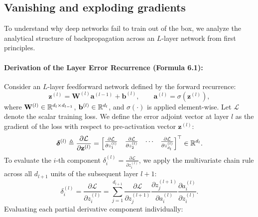 \subsection{Vanishing and exploding gradients}
\label{sec:vanishing_exploding_gradients}

To understand why deep networks fail to train out of the box, we analyze the analytical structure of backpropagation across an $L$-layer network from first principles.

\paragraph{Derivation of the Layer Error Recurrence (Formula 6.1):}
Consider an $L$-layer feedforward network defined by the forward recurrence:
\begin{equation}
\mathbf{z}^{(l)} = \mathbf{W}^{(l)} \mathbf{a}^{(l-1)} + \mathbf{b}^{(l)}, \qquad \mathbf{a}^{(l)} = \sigma(\mathbf{z}^{(l)}),
\end{equation}
where $\mathbf{W}^{(l)} \in \mathbb{R}^{d_l \times d_{l-1}}$, $\mathbf{b}^{(l)} \in \mathbb{R}^{d_l}$, and $\sigma(\cdot)$ is applied element-wise. Let $\mathcal{L}$ denote the scalar training loss. We define the error adjoint vector at layer $l$ as the gradient of the loss with respect to pre-activation vector $\mathbf{z}^{(l)}$:
\begin{equation}
\boldsymbol{\delta}^{(l)} \triangleq \frac{\partial \mathcal{L}}{\partial \mathbf{z}^{(l)}} = \begin{bmatrix} \frac{\partial \mathcal{L}}{\partial z_1^{(l)}} & \frac{\partial \mathcal{L}}{\partial z_2^{(l)}} & \cdots & \frac{\partial \mathcal{L}}{\partial z_{d_l}^{(l)}} \end{bmatrix}^\top \in \mathbb{R}^{d_l}.
\end{equation}
To evaluate the $i$-th component $\delta_i^{(l)} = \frac{\partial \mathcal{L}}{\partial z_i^{(l)}}$, we apply the multivariate chain rule across all $d_{l+1}$ units of the subsequent layer $l+1$:
\begin{equation}
\delta_i^{(l)} = \frac{\partial \mathcal{L}}{\partial z_i^{(l)}} = \sum_{j=1}^{d_{l+1}} \frac{\partial \mathcal{L}}{\partial z_j^{(l+1)}} \frac{\partial z_j^{(l+1)}}{\partial a_i^{(l)}} \frac{\partial a_i^{(l)}}{\partial z_i^{(l)}}.
\label{eq:chain_rule_expansion}
\end{equation}
Evaluating each partial derivative component individually:
